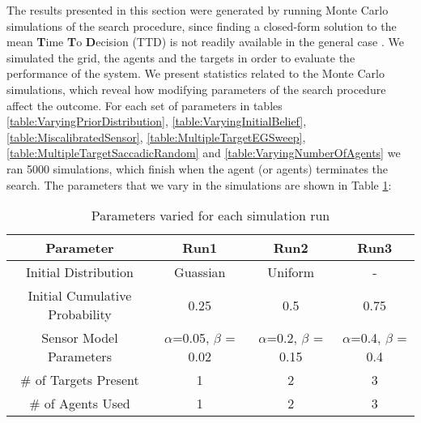 



The results presented in this section were generated by running Monte Carlo simulations of the search procedure, since finding a closed-form solution to the mean \textbf{T}ime \textbf{T}o \textbf{D}ecision (TTD) is not readily available in the general case \cite{Chung2012AnalysisStrategies}. We simulated the grid, the agents and the targets in order to evaluate the performance of the system.
We present statistics related to the Monte Carlo simulations, which reveal how modifying parameters of the search procedure affect the outcome. For each set of parameters in tables \ref{table:VaryingPriorDistribution}, \ref{table:VaryingInitialBelief}, \ref{table:MiscalibratedSensor}, \ref{table:MultipleTargetEGSweep}, \ref{table:MultipleTargetSaccadicRandom} and \ref{table:VaryingNumberOfAgents} we ran 5000 simulations, which finish when the agent (or agents) terminates the search. The parameters that we vary in the simulations are shown in Table \ref{table:SimRunParameters}: 

\begin{table}[H]
    \centering
    \begin{tabular}{|c|c|c|c|}
    \hline
         Parameter&  Run1 & Run2 & Run3 \\
         \hline
         Initial Distribution & Guassian & Uniform & - \\
         
         \hline
         Initial Cumulative Probability & 0.25 & 0.5 & 0.75 \\
         
         \hline
         Sensor Model Parameters & $\alpha$=0.05, $\beta$ = 0.02 & $\alpha$=0.2, $\beta$ = 0.15 &
         $\alpha$=0.4, $\beta$ = 0.4 \\
         
         \hline
         \# of Targets Present & 1 & 2 & 3 \\
         
         \hline
         \# of Agents Used & 1 & 2 & 3 \\
         
         \hline
    \end{tabular}
    \caption{Parameters varied for each simulation run}
    \label{table:SimRunParameters}
\end{table}

